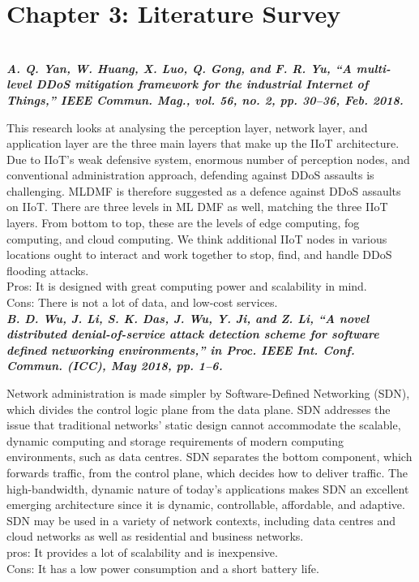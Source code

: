 \documentclass[12pt,a4paper,twocolumn,fleqn]{article}
\begin{document}
\section{Chapter 3: Literature Survey} 
\hfill \\
\textbf{\emph {A. Q. Yan, W. Huang, X. Luo, Q. Gong, and F. R. Yu, “A multi-level DDoS mitigation framework for the industrial Internet of Things,” IEEE Commun. Mag., vol. 56, no. 2, pp. 30–36, Feb. 2018.}}

This research looks at analysing the perception layer, network layer, and application layer are the three main layers that make up the IIoT architecture. Due to IIoT's weak defensive system, enormous number of perception nodes, and conventional administration approach, defending against DDoS assaults is challenging. MLDMF is therefore suggested as a defence against DDoS assaults on IIoT. There are three levels in ML DMF as well, matching the three IIoT layers. From bottom to top, these are the levels of edge computing, fog computing, and cloud computing. We think additional IIoT nodes in various locations ought to interact and work together to stop, find, and handle DDoS flooding attacks.\\
Pros: It is designed with great computing power and scalability in mind.\\
Cons: There is not a lot of data, and low-cost services.\\


\textbf{\emph {B. D. Wu, J. Li, S. K. Das, J. Wu, Y. Ji, and Z. Li, “A novel distributed denial-of-service attack detection scheme for software defined networking environments,” in Proc. IEEE Int. Conf. Commun. (ICC), May 2018, pp. 1–6.}}

Network administration is made simpler by Software-Defined Networking (SDN), which divides the control logic plane from the data plane. SDN addresses the issue that traditional networks' static design cannot accommodate the scalable, dynamic computing and storage requirements of modern computing environments, such as data centres. SDN separates the bottom component, which forwards traffic, from the control plane, which decides how to deliver traffic. The high-bandwidth, dynamic nature of today's applications makes SDN an excellent emerging architecture since it is dynamic, controllable, affordable, and adaptive. SDN may be used in a variety of network contexts, including data centres and cloud networks as well as residential and business networks.\\
pros: It provides a lot of scalability and is inexpensive.\\
Cons:  It has a low power consumption and a short battery life.\\ \\
\end{document}
